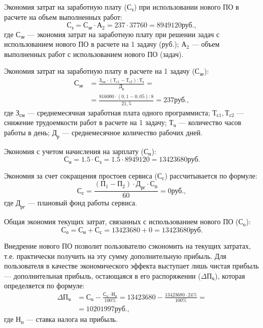 Экономия затрат на заработную плату ($\text{С}_\text{з}$) при использовании нового ПО в расчете на объем выполненных работ:
\begin{displaymath}
  \text{С}_\text{з} = \text{С}_\text{зе} \cdot \text{А}_\text{2} = 237 \cdot 37760 = 8949120 \text{руб.},
\end{displaymath}
где $\text{С}_\text{зе}$ --- экономия затрат на заработную плату при решении задач с использованием нового ПО в расчете на 1 задачу (руб.); $\text{А}_\text{2}$ --- объем выполненных работ с использованием нового ПО (задач).

Экономия затрат на заработную плату в расчете на 1 задачу ($\text{С}_\text{зе}$):
\begin{align*}
  \text{С}_\text{зе} &= \frac{\text{З}_\text{см} \cdot (\text{Т}_\text{с1} - \text{Т}_\text{с2}) : \text{Т}_\text{ч}}{\text{Д}_\text{р}} =\\
  &= \frac{816000 \cdot (0,1 - 0,05) : 8}{21,5} = 237 \text{руб.},
\end{align*}
где $\text{З}_\text{см}$ --- среднемесячная заработная плата одного программиста; $\text{Т}_\text{с1}, \text{Т}_\text{с2}$ --- снижение трудоемкости работ в расчете на 1 задачу; $\text{Т}_\text{ч}$ --- количество часов работы в день; $\text{Д}_\text{р}$ --- среднемесячное количество рабочих дней.

Экономия с учетом начисления на зарплату ($\text{С}_\text{н}$):
\begin{displaymath}
  \text{С}_\text{н} = 1.5 \cdot \text{С}_\text{з} = 1.5 \cdot 8949120 = 13423680 \text{руб.}
\end{displaymath}

Экономия за счет сокращения простоев сервиса ($\text{С}_\text{с}$) рассчитывается по формуле:
\begin{displaymath}
  \text{С}_\text{с} = \frac{(\text{П}_\text{1} - \text{П}_\text{2}) \cdot \text{Д}_\text{рг} \cdot \text{С}_\text{п}}{60} = 0 \text{руб.},
\end{displaymath}
где $\text{Д}_\text{рг}$ --- плановый фонд работы сервиса.

Общая экономия текущих затрат, связанных с использованием нового ПО ($\text{С}_\text{о}$):
\begin{displaymath}
  \text{С}_\text{о} = \text{С}_\text{н} + \text{С}_\text{с} = 13423680 + 0 = 13423680 \text{руб.}
\end{displaymath}

Внедрение нового ПО позволит пользователю сэкономить на текущих затратах, т.е. практически получить на эту сумму дополнительную прибыль. Для пользователя в качестве экономического эффекта выступает лишь чистая прибыль --- дополнительная прибыль, остающаяся в его распоряжении ($\Delta\text{П}_{\text{ч}}$), которая определяется по формуле:
\begin{align*}
  \Delta\text{П}_{\text{ч}} &= \text{С}_\text{о} - \frac{\text{С}_\text{о} \cdot \text{Н}_\text{п}}{100\%} = 13423680 - \frac{13423680 \cdot 24\%}{100\%} =\\
  &= 10201997 \text{руб.},
\end{align*}
где $\text{Н}_\text{п}$ --- ставка налога на прибыль.

